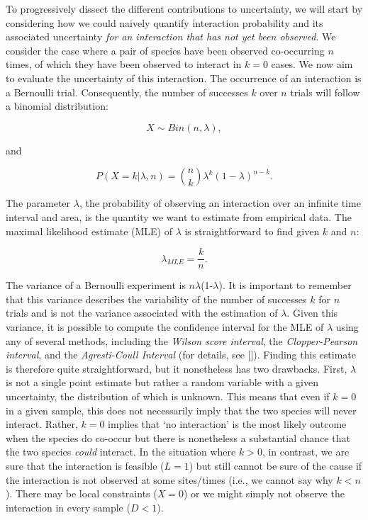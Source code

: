 \documentclass[12pt]{article}
\begin{document}
  To progressively dissect the different contributions to uncertainty, we will start by considering how we could naively quantify interaction probability and its associated uncertainty \emph{for an interaction that has not yet been observed}. We consider the case where a pair of species have been observed co-occurring $n$ times, of which they have been observed to interact in $k = 0$ cases. We now aim to evaluate the uncertainty of this interaction. The occurrence of an interaction is a Bernoulli trial. Consequently, the number of successes $k$ over $n$ trials will follow a binomial distribution: 
      
      \begin{equation}
        X \sim Bin(n,\lambda) ,
      \end{equation}

      \noindent and 

      \begin{equation}
         P(X = k|\lambda,n) = {n \choose k}\lambda^k(1-\lambda)^{n-k} . 
         \label{likelihood}
      \end{equation}

  \noindent The parameter $\lambda$, the probability of observing an interaction over an infinite time interval and area, is the quantity we want to estimate from empirical data. 
  The maximal likelihood estimate (MLE) of $\lambda$ is straightforward to find given $k$ and $n$:

      \begin{equation}
        \lambda_{MLE} = \frac{k}{n}  .
        \label{theta_MLE}
      \end{equation}

  The variance of a Bernoulli experiment is $n\lambda$(1-$\lambda$). It is important to remember that this variance describes the variability of the number of successes $k$ for $n$ trials and is not the variance associated with the estimation of $\lambda$. Given this variance, it is possible to compute the confidence interval for the MLE of $\lambda$ using any of several methods, including the \emph{Wilson score interval}, the \emph{Clopper-Pearson interval}, and the \emph{Agresti-Coull Interval} (for details, see [\citealp{}]). Finding this estimate is therefore quite straightforward, but it nonetheless has two drawbacks. First, $\lambda$ is not a single point estimate but rather a random variable with a given uncertainty, the distribution of which is unknown. This means that even if $k = 0$ in a given sample, this does not necessarily imply that the two species will never interact. Rather, $k = 0$ implies that `no interaction' is the most likely outcome when the species do co-occur but there is nonetheless a substantial chance that the two species \emph{could} interact. In the situation where $k>0$, in contrast, we are sure that the interaction is feasible ($L = 1$) but still cannot be sure of the cause if the interaction is not observed at some sites/times (i.e., we cannot say why $k<n$). There may be local constraints ($X=0$) or we might simply not observe the interaction in every sample ($D<1$). 
\end{document}
